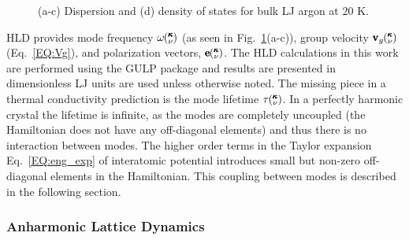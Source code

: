 \begin{figure}[t]
\begin{center}
\renewcommand{\figure}{Fig.}
\caption{(a-c) Dispersion and (d) density of states for bulk LJ argon at 20 K.}
\label{FIG:bulk_dispersion}
\end{center}
\end{figure}

HLD provides mode frequency $\omega \mspace{-4.0mu}\left(\mspace{-8.0mu} \begin{smallmatrix}&\pmb{\kappa} \\&\nu\end{smallmatrix} \mspace{-3.0mu}\right)$ (as seen in Fig.~\ref{FIG:bulk_dispersion}(a-c)), group velocity $\pmb{\mathrm{v}}_{g}\mspace{-4.0mu}\left(\mspace{-8.0mu} \begin{smallmatrix}&\pmb{\kappa} \\&\nu\end{smallmatrix} \mspace{-3.0mu}\right)$ (Eq.~\ref{EQ:Vg}), and polarization vectors, $\pmb{\mathrm{e}}\mspace{-4.0mu}\left(\mspace{-8.0mu} \begin{smallmatrix}&\pmb{\kappa} \\&\nu\end{smallmatrix} \mspace{-3.0mu}\right)$. The HLD calculations in this work are performed using the GULP package \cite{GULP} and results are presented in dimensionless LJ units are used unless otherwise noted. The missing piece in a thermal conductivity prediction is the mode lifetime $\tau \mspace{-4.0mu}\left(\mspace{-8.0mu} \begin{smallmatrix}&\pmb{\kappa} \\&\nu\end{smallmatrix} \mspace{-3.0mu}\right)$. In a perfectly harmonic crystal the lifetime is infinite, as the modes are completely uncoupled (the Hamiltonian does not have any off-diagonal elements) and thus there is no interaction between modes. The higher order terms in the Taylor expansion Eq.~\ref{EQ:eng_exp} of interatomic potential introduces small but non-zero off-diagonal elements in the Hamiltonian. This coupling between modes is described in the following section.

\subsubsection{Anharmonic Lattice Dynamics}

